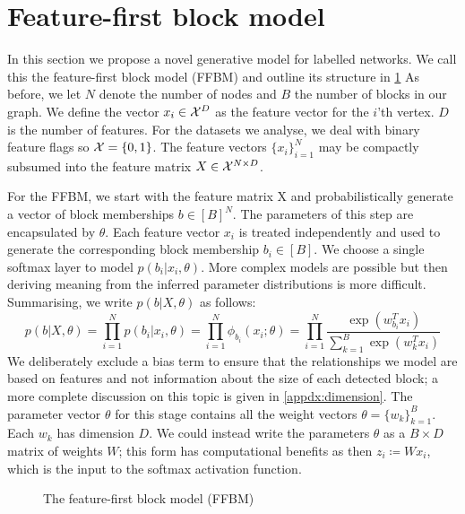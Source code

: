 \section{Feature-first block model}

In this section we propose a novel generative model for labelled networks. We call this the feature-first block model (FFBM) and outline its structure in \ref{fig:ffbm} As before, we let $N$ denote the number of nodes and $B$ the number of blocks in our graph. We define the vector $x_i \in \mathcal{X}^D$ as the feature vector for the $i$'th vertex. $D$ is the number of features. For the datasets we analyse, we deal with binary feature flags so $\mathcal{X} = \{0, 1\}$. The feature vectors $\{x_i\}_{i=1}^{N}$ may be compactly subsumed into the feature matrix $X \in \mathcal{X}^{N \times D}$.

For the FFBM, we start with the feature matrix X and probabilistically generate a vector of block memberships $b \in [B]^N$. The parameters of this step are encapsulated by $\theta$. Each feature vector $x_i$ is treated independently and used to generate the corresponding block membership $b_i \in [B]$. We choose a single softmax layer to model $p(b_i | x_i, \theta)$. More complex models are possible but then deriving meaning from the inferred parameter distributions is more difficult. Summarising, we write $p(b | X, \theta)$ as follows:
%
\begin{equation}
	p(b| X, \theta) = \prod_{i=1}^{N} p(b_i | x_i, \theta) = \prod_{i=1}^{N} \phi_{b_i} (x_i; \theta)
	= \prod_{i=1}^{N} \frac{\exp\left(w_{b_i}^T x_i\right)}{\sum_{k=1}^{B} \exp \left( w_k^T x_i\right)}
\end{equation}
%
We deliberately exclude a bias term to ensure that the relationships we model are based on features and not information about the size of each detected block; a more complete discussion on this topic is given in \ref{appdx:dimension}. The parameter vector $\theta$ for this stage contains all the weight vectors $\theta = \{w_k\}_{k=1}^{B}$. Each $w_k$ has dimension $D$. We could instead write the parameters $\theta$ as a $B \times D$ matrix of weights $W$; this form has computational benefits as then $z_i \coloneqq W x_i$, which is the input to the softmax activation function.

\begin{figure}[!h]
	\centering
	\caption{The feature-first block model (FFBM)}
	\label{fig:ffbm}
\end{figure}

